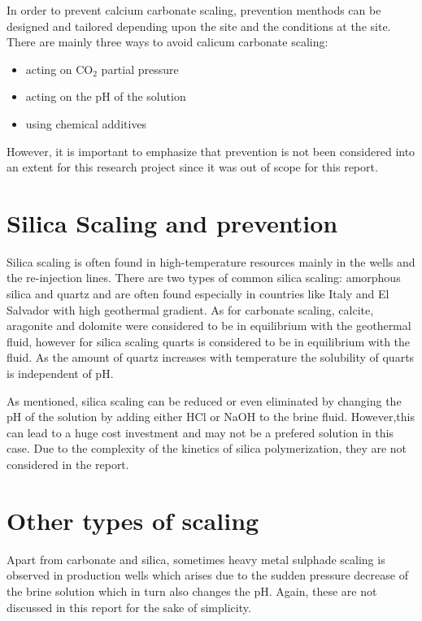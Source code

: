 In order to prevent calcium carbonate scaling, prevention menthods can be designed and tailored depending upon the site  and the conditions at the site. There are mainly three ways to avoid calicum carbonate scaling: 
\begin{itemize}
    \item acting on CO$_2$ partial pressure 
    \item acting on the pH of the solution 
    \item using chemical additives 
\end{itemize}

However, it is important to emphasize that prevention is not been considered into an extent for this research project since it was out of scope for this report. 
\section{Silica Scaling and prevention}
\newline \newline

Silica scaling is often found in high-temperature resources mainly in the wells and the re-injection lines. There are two types of common silica scaling: amorphous silica and quartz and are often found especially in countries like Italy and El Salvador with high geothermal gradient. As for carbonate scaling, calcite, aragonite and dolomite were considered to be in equilibrium with the geothermal fluid, however for silica scaling quarts is considered to be in equilibrium with the fluid. As the amount of quartz increases with temperature the solubility of quarts is independent of pH. \cite{corsi1986scaling}

As mentioned, silica scaling can be reduced or even eliminated by changing the pH of the solution by adding either HCl or NaOH to the brine fluid. However,this can lead to a huge cost investment and may not be a prefered solution in this case. 
\newline \newline
Due to the complexity of the kinetics of silica polymerization, they are not considered in the report. 
\section{Other types of scaling}
Apart from carbonate and silica, sometimes heavy metal sulphade scaling is observed in production wells which arises due to the sudden pressure decrease of the brine solution which in turn also changes the pH. Again, these are not discussed in this report for the sake of simplicity.  
